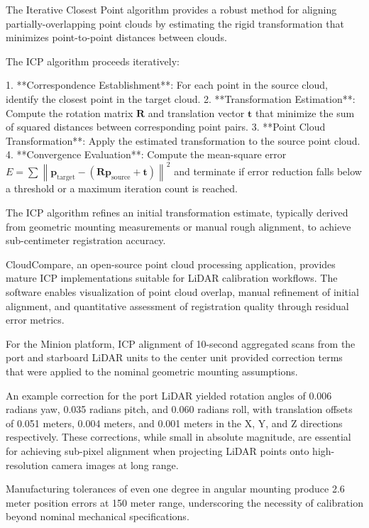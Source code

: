 
The Iterative Closest Point algorithm provides a robust method for aligning partially-overlapping point clouds by estimating the rigid transformation that minimizes point-to-point distances between clouds.

The ICP algorithm proceeds iteratively:

1. **Correspondence Establishment**: For each point in the source cloud, identify the closest point in the target cloud.
2. **Transformation Estimation**: Compute the rotation matrix $\mathbf{R}$ and translation vector $\mathbf{t}$ that minimize the sum of squared distances between corresponding point pairs.
3. **Point Cloud Transformation**: Apply the estimated transformation to the source point cloud.
4. **Convergence Evaluation**: Compute the mean-square error $E = \sum \left\| \mathbf{p}_{\text{target}} - (\mathbf{R} \mathbf{p}_{\text{source}} + \mathbf{t}) \right\|^2$ and terminate if error reduction falls below a threshold or a maximum iteration count is reached.

The ICP algorithm refines an initial transformation estimate, typically derived from geometric mounting measurements or manual rough alignment, to achieve sub-centimeter registration accuracy.

CloudCompare, an open-source point cloud processing application, provides mature ICP implementations suitable for LiDAR calibration workflows.
The software enables visualization of point cloud overlap, manual refinement of initial alignment, and quantitative assessment of registration quality through residual error metrics.

For the Minion platform, ICP alignment of 10-second aggregated scans from the port and starboard LiDAR units to the center unit provided correction terms that were applied to the nominal geometric mounting assumptions.

An example correction for the port LiDAR yielded rotation angles of 0.006 radians yaw, 0.035 radians pitch, and 0.060 radians roll, with translation offsets of 0.051 meters, 0.004 meters, and 0.001 meters in the X, Y, and Z directions respectively.
These corrections, while small in absolute magnitude, are essential for achieving sub-pixel alignment when projecting LiDAR points onto high-resolution camera images at long range.

Manufacturing tolerances of even one degree in angular mounting produce 2.6 meter position errors at 150 meter range, underscoring the necessity of calibration beyond nominal mechanical specifications.

